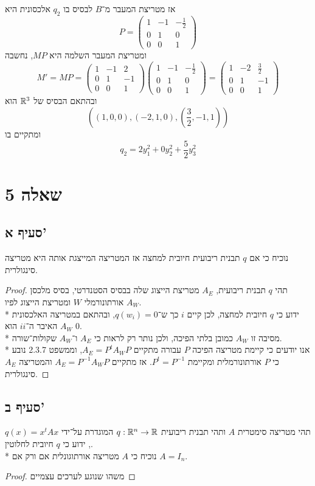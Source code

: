 אז מטריצת המעבר מ־$B$ לבסיס בו $q_2$ אלכסונית היא
\[
	P = \begin{pmatrix}
		1 & -1 & -\frac{1}{2} \\
		0 & 1 & 0 \\
		0 & 0 & 1
	\end{pmatrix}
\]
ומטריצת המעבר השלמה היא $MP$, נחשבה
\[
	M' = MP = 
	\begin{pmatrix} 1 & -1 & 2 \\
		0 & 1 & -1 \\
		0 & 0 & 1
	\end{pmatrix}
	\begin{pmatrix}
		1 & -1 & -\frac{1}{2} \\
		0 & 1 & 0 \\
		0 & 0 & 1
	\end{pmatrix}
	= \begin{pmatrix}
		1 & -2 & \frac{3}{2} \\
		0 & 1 & -1 \\
		0 & 0 & 1
	\end{pmatrix}
\]
ובהתאם הבסיס של $\mathbb{R}^3$ הוא
\[
	((1, 0, 0), (-2, 1, 0), (\frac{3}{2}, -1, 1))
\]
ומתקיים בו
\[
	q_2 = 2y_1^2 + 0y_2^2 + \frac{5}{2}y_3^2
\]

\section{שאלה 5}
\subsection{סעיף א'}
נוכיח כי אם $q$ תבנית ריבועית חיובית למחצה אז המטריצה המייצגת אותה היא מטריצה סינגולרית.
\begin{proof}
	תהי $q$ תבנית ריבועית, $A_E$ מטריצת הייצוג שלה בבסיס הסטנדרטי, בסיס מלכסן אורתונורמלי $W$ ומטריצת הייצוג לפיו $A_W$. \\*
	ידוע כי $q$ חיובית למחצה, לכן קיים $i$ כך ש־$q(w_i) = 0$, ובהתאם במטריצה האלכסונית $A_W$ האיבר ה־$ii$ הוא $0$. \\*
	מסיבה זו $A_W$ כמובן בלתי הפיכה, ולכן נותר רק לראות כי $A_E$ ו־$A_W$ שקולות־שורה. \\*
	אנו יודעים כי קיימת מטריצה הפיכה $P$ עבורה מתקיים $A_E = P^t A_W P$, וממשפט 2.3.7 נובע כי $P$ אורתונורמלית ומקיימת $P^t = P^{-1}$.
	אז מתקיים $A_E = P^{-1} A_W P$ והמטריצה $A_E$ סינגולרית.
\end{proof}

\subsection{סעיף ב'}
תהי מטריצה סימטרית $A$ ותהי תבנית ריבועית $q : \mathbb{R}^n \to \mathbb{R}$ המוגדרת על־ידי $q(x) = x^t A x$, ידוע כי $q$ חיובית לחלוטין. \\*
נוכיח כי $A$ מטריצה אורתוגונלית אם ורק אם $A = I_n$.
\begin{proof}
	משהו שנוגע לערכים עצמיים
\end{proof}


